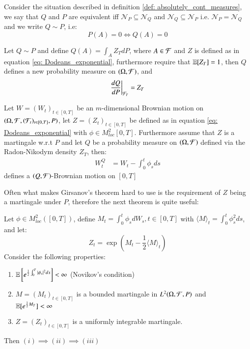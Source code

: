 \begin{definition}
Consider the situation described in definition \ref{def: absolutely_cont_measures}, we say that $Q$ and $P$ are equivalent iff $\mathcal{N}_{P} \subseteq \mathcal{N}_{Q}$ and 
$\mathcal{N}_{Q} \subseteq \mathcal{N}_{P}$ i.e.  $\mathcal{N}_{P}= \mathcal{N}_{Q}$
and we write $Q\sim P$, i.e: 
$$
P(A) = 0 \iff Q(A) = 0
$$
\end{definition}

\begin{theorem}
Let $Q\sim P$ and define $Q(A) = \int_{A}Z_{T}dP$, where $A \in \mathcal{F}$ and $Z$ is defined as in equation \ref{eq: Dodeans_exponential}, furthermore require that $\mathbb{E}[Z_{T}] = 1$, then $Q$ defines a new probability measure on $(\Omega, \mathcal{F})$, and $$
\frac{dQ}{dP}\bigg{|}_{\mathcal{F}_{T}} = Z_{T}
$$     
\end{theorem} 

\begin{theorem}
\label{thm: Girsanov's_thm}
Let $W = (W_{t})_{t\in [0,T]}$ be an $m$-dimensional Brownian motion on $(\Omega, \mathcal{F}, (\mathcal{F}_{t})_{t\in [0,T]}, P)$, let $Z = (Z_{t})_{t\in [0,T]}$  be defined as in equation \ref{eq: Dodeans_exponential} with $\phi \in M^{2}_{loc}[0,T]$. Furthermore assume that $Z$ is a martingale w.r.t $P$ and let $Q$ be a probability measure on $(\Omega, \mathcal{F})$ defined via the Radon-Nikodym density $Z_{T}$, then: 
\begin{align*}
W_{t}^{Q} &= W_{t} - \int_{0}^{t}\phi_{s}ds    
\end{align*}
defines a $(Q,\mathcal{F})$-Brownian motion on $[0,T]$
\end{theorem}

Often what makes Girsanov's theorem hard to use is the requirement of $Z$ being a martingale under $P$, therefore the next theorem is quite useful: 

\newpage 
\begin{theorem}
\label{thm: Novikov_cond_and_implications}
Let $\phi \in M^{2}_{loc}([0,T])$, define $M_{t} = \int_{0}^{t}\phi_{s}dW_{s}, t \in [0,T]$ with $\langle M \rangle_{t} = \int_{0}^{t}\phi^{2}_{s}ds$, and let: 
$$
Z_{t} = \exp\left(
M_{t} - \frac{1}{2}\langle M \rangle_{t}
\right)
$$
Consider the following properties: 
\begin{enumerate}[label= (\roman*), leftmargin=*]
    \item $\mathbb{E}\left[e^{\frac{1}{2}\int_{0}^{T}|\phi_{s}|^{2}ds}\right] < \infty$ (Novikov's condition)
    \item $M = (M_{t})_{t\in [0,T]}$ is a bounded martingale in $L^{2}(\Omega, \mathcal{F}, P)$ and \\ 
    $\mathbb{E}[e^{\frac{1}{2} M_{T}}] < \infty$ 
    \item $Z = (Z_{t})_{t\in [0,T]}$ is a uniformly integrable martingale. 
\end{enumerate}

Then $(i) \implies (ii) \implies (iii)$
\end{theorem} 

